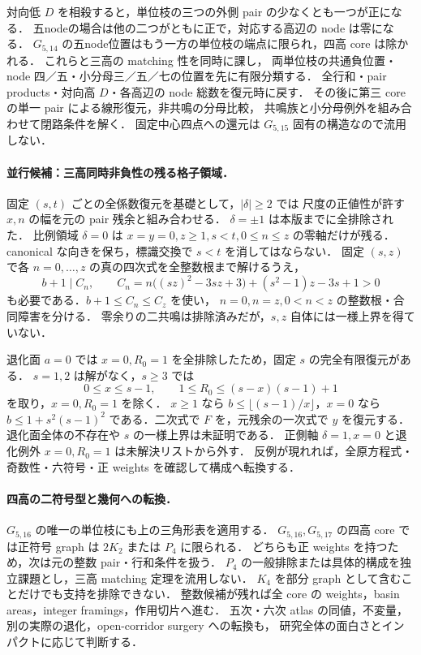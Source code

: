 対向低 $D$ を相殺すると，単位枝の三つの外側 pair の少なくとも一つが正になる．
五nodeの場合は他の二つがともに正で，対応する高辺の node は零になる．
$G_{5,14}$ の五node位置はもう一方の単位枝の端点に限られ，四高 core は除かれる．
これらと三高の matching 性を同時に課し，
両単位枝の共通負位置・node 四／五・小分母三／五／七の位置を先に有限分類する．
全行和・pair products・対向高 $D$・各高辺の node 総数を復元時に戻す．
その後に第三 core の単一 pair による線形復元，非共鳴の分母比較，
共鳴族と小分母例外を組み合わせて閉路条件を解く．
固定中心四点への還元は $G_{5,15}$ 固有の構造なので流用しない．

\paragraph{並行候補：三高同時非負性の残る格子領域．}
固定 $(s,t)$ ごとの全係数復元を基礎として，$|\delta|\ge2$ では
尺度の正値性が許す $x,n$ の幅を元の pair 残余と組み合わせる．
$\delta=\pm1$ は本版までに全排除された．
比例領域 $\delta=0$ は $x=y=0,z\ge1,s<t,0\le n\le z$ の零軸だけが残る．
canonical な向きを保ち，標識交換で $s<t$ を消してはならない．
固定 $(s,z)$ で各 $n=0,\ldots,z$ の真の四次式を全整数根まで解けるうえ，
\[
 b+1\mid C_n,
 \qquad C_n=n\bigl((sz)^2-3sz+3\bigr)+(s^2-1)z-3s+1>0
\]
も必要である．$b+1\le C_n\le C_z$ を使い，
$n=0,n=z,0<n<z$ の整数根・合同障害を分ける．
零余りの二共鳴は排除済みだが，$s,z$ 自体には一様上界を得ていない．

退化面 $a=0$ では $x=0,R_0=1$ を全排除したため，固定 $s$ の完全有限復元がある．
$s=1,2$ は解がなく，$s\ge3$ では
\[
 0\le x\le s-1,\qquad 1\le R_0\le(s-x)(s-1)+1
\]
を取り，$x=0,R_0=1$ を除く．
$x\ge1$ なら $b\le\lfloor(s-1)/x\rfloor$，$x=0$ なら
$b\le1+s^2(s-1)^2$ である．二次式で $F$ を，元残余の一次式で $y$ を復元する．
退化面全体の不存在や $s$ の一様上界は未証明である．
正側軸 $\delta=1,x=0$ と退化例外 $x=0,R_0=1$ は未解決リストから外す．
反例が現れれば，全原方程式・奇数性・六符号・正 weights を確認して構成へ転換する．

\paragraph{四高の二符号型と幾何への転換．}
$G_{5,16}$ の唯一の単位枝にも上の三角形表を適用する．
$G_{5,16},G_{5,17}$ の四高 core では正符号 graph は $2K_2$ または $P_4$ に限られる．
どちらも正 weights を持つため，次は元の整数 pair・行和条件を扱う．
$P_4$ の一般排除または具体的構成を独立課題とし，三高 matching 定理を流用しない．
$K_4$ を部分 graph として含むことだけでも支持を排除できない．
整数候補が残れば全 core の weights，basin areas，integer framings，作用切片へ進む．
五次・六次 atlas の同値，不変量，別の実際の退化，open-corridor surgery への転換も，
研究全体の面白さとインパクトに応じて判断する．
